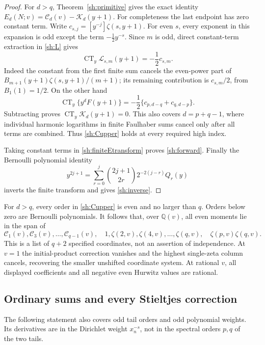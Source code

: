 \begin{proof}
For $d>q$, Theorem~\ref{sh:primitive} gives the exact identity
$E_d(N;v)=\mathcal C_d(v)-\mathcal K_d(y+1)$.
For completeness the last endpoint has zero constant term.
Write $c_{s,j}=[y^{-j}]\zeta(s,y+1)$.  For even $s$, every
exponent in this expansion is odd except the term
$-\tfrac12y^{-s}$.  Since $m$ is odd, direct constant-term
extraction in \eqref{sh:L} gives
\[
 \operatorname{CT}_y\mathcal L_{s,m}(y+1)
 =-\frac12c_{s,m}.
\]
Indeed the constant from the first finite sum cancels the
even-power part of $B_{m+1}(y+1)\zeta(s,y+1)/(m+1)$; its
remaining contribution is $c_{s,m}/2$, from
$B_1(1)=1/2$.  On the other hand
\[
 \operatorname{CT}_y\{y^dF(y+1)\}
 =-\frac12\{c_{p,d-q}+c_{q,d-p}\}.
\]
Subtracting proves $\operatorname{CT}_y\mathcal K_d(y+1)=0$.
This also covers $d=p+q-1$, where individual harmonic logarithms
in finite Faulhaber sums cancel only after all terms are combined.
Thus \eqref{sh:Cupper} holds at every required high index.

Taking constant terms in \eqref{sh:finiteEtransform} proves
\eqref{sh:forward}.  Finally the Bernoulli polynomial identity
\[
 y^{2j+1}=\sum_{r=0}^j
       \binom{2j+1}{2r}2^{-2(j-r)}Q_r(y)
\]
inverts the finite transform and gives \eqref{sh:inverse}.
\end{proof}

For $d>q$, every order in \eqref{sh:Cupper} is even and no larger
than $q$.  Orders below zero are Bernoulli polynomials.  It follows
that, over $\mathbb Q(v)$, all even moments lie in the span of
\[
 \mathcal C_1(v),\mathcal C_3(v),\ldots,\mathcal C_{q-1}(v),
 \quad 1,\zeta(2,v),\zeta(4,v),\ldots,\zeta(q,v),
 \quad\zeta(p,v)\zeta(q,v).
\]
This is a list of $q+2$ specified coordinates, not an assertion of
independence.  At $v=1$ the initial-product correction vanishes and
the highest single-zeta column cancels, recovering the smaller
unshifted coordinate system.  At rational $v$, all displayed
coefficients and all negative even Hurwitz values are rational.

\subsection{Ordinary sums and every Stieltjes correction}

The following statement also covers odd tail orders and odd polynomial
weights.  Its derivatives are in the Dirichlet weight $x_n^{-s}$,
not in the spectral orders $p,q$ of the two tails.

